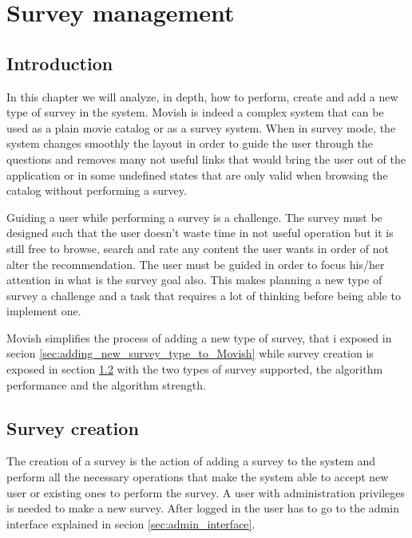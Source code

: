 \chapter{Survey management}
\label{chapter:<survey_management>}

\section{Introduction}
\label{sec:survey_management_introduction}

In this chapter we will analyze, in depth, how to perform, create and add a new type of survey in the system. Movish is indeed a complex system that can be used as a plain movie catalog or as a survey system. When in survey mode, the system changes smoothly the layout in order to guide the user through the questions and removes many not useful links that would bring the user out of the application or in some undefined states that are only valid when browsing the catalog without performing a survey.

Guiding a user while performing a survey is a challenge. The survey must be designed such that the user doesn't waste time in not useful operation but it is still free to browse, search and rate any content the user wants in order of not alter the recommendation. The user must be guided in order to focus his/her attention in what is the survey goal also. This makes planning a new type of survey a challenge and a task that requires a lot of thinking before being able to implement one. 

Movish simplifies the process of adding a new type of survey, that i exposed in secion \ref{sec:adding_new_survey_type_to_Movish} while survey creation is exposed in section \ref{sec:survey_creation} with the two types of survey supported, the algorithm performance and the algorithm strength.

\section{Survey creation}
\label{sec:survey_creation}

The creation of a survey is the action of adding a survey to the system and perform all the necessary operations that make the system able to accept new user or existing ones to perform the survey. A user with administration privileges is needed to make a new survey. After logged in the user has to go to the admin interface explained in secion \ref{sec:admin_interface}.

